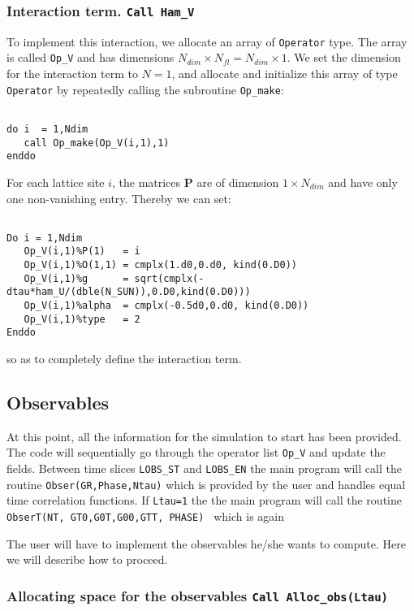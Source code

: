\subsubsection{Interaction term. \texttt{Call Ham\_V}}
To implement this interaction, we allocate an array of \texttt{Operator} type. The array is called  \texttt{Op\_V} and has dimensions $N_{dim}\times N_{fl}=N_{dim} \times 1$. 
We set the dimension for the interaction term to  $N=1$, and  allocate and initialize this array of type  \texttt{Operator} by repeatedly calling the subroutine \texttt{Op\_make}: 

\begin{lstlisting}

do i  = 1,Ndim
   call Op_make(Op_V(i,1),1)
enddo

\end{lstlisting}
For each lattice site $i$, the  matrices ${\bm P}$ are of dimension $1\times N_{dim} $ and have only one non-vanishing entry. Thereby we can set:

\begin{lstlisting}

Do i = 1,Ndim
   Op_V(i,1)%P(1)   = i
   Op_V(i,1)%O(1,1) = cmplx(1.d0,0.d0, kind(0.D0))
   Op_V(i,1)%g      = sqrt(cmplx(-dtau*ham_U/(dble(N_SUN)),0.D0,kind(0.D0)))
   Op_V(i,1)%alpha  = cmplx(-0.5d0,0.d0, kind(0.D0))
   Op_V(i,1)%type   = 2
Enddo

\end{lstlisting}
so as to completely define the interaction term. 

\subsection{Observables}
At this point, all the information   for the simulation to  start has been provided.  The code will sequentially go through  the operator list  \texttt{Op\_V}  and update the  fields.   Between  time slices   \texttt{LOBS\_ST}  and  \texttt{LOBS\_EN}   the main program will call the routine  \texttt{Obser(GR,Phase,Ntau)}   which is provided by the user and handles equal time correlation functions. 
If \texttt{Ltau=1} the the main program will call the routine \texttt{ObserT(NT,  GT0,G0T,G00,GTT, PHASE) }   which is again 


The user will have to  implement the  observables  he/she  wants to compute. Here  we  will describe how to  proceed. 

\subsubsection{Allocating space for the observables \texttt{Call Alloc\_obs(Ltau) }} 
\label{Alloc_obs_sec}

